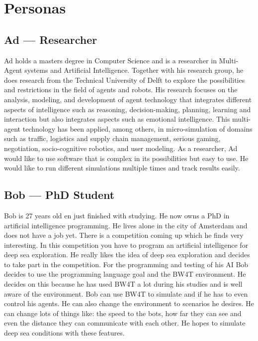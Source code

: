 \section*{Personas}
\subsection*{Ad –-- Researcher}
Ad holds a masters degree in Computer Science and is a researcher in Multi-Agent systems and Artificial Intelligence. Together with his research group, he does research from the Technical University of Delft to explore the possibilities and restrictions in the field of agents and robots. His research focuses on the analysis, modeling, and development of agent technology that integrates different aspects of intelligence such as reasoning, decision-making, planning, learning and interaction but also integrates aspects such as emotional intelligence. This multi-agent technology has been applied, among others, in micro-simulation of domains such as traffic, logistics and supply chain management, serious gaming, negotiation, socio-cognitive robotics, and user modeling. 
As a researcher, Ad would like to use software that is complex in its possibilities but easy to use. He would like to run different simulations multiple times and track results easily.

\subsection*{Bob –-- PhD Student}
Bob is 27 years old en just finished with studying. He now owns a PhD in artificial intelligence programming. He lives alone in the city of Amsterdam and does not have a job yet. There is a competition coming up which he finds very interesting. In this competition you have to program an artificial intelligence for deep sea exploration. He really likes the idea of deep sea exploration and decides to take part in the competition. 
For the programming and testing of his AI Bob decides to use the programming language goal and the BW4T environment. He decides on this because he has used BW4T a lot during his studies and is well aware of the environment. Bob can use BW4T to simulate and if he has to even control his agents. He can also change the environment to scenarios he desires. He can change lots of things like: the speed to the bots, how far they can see and even the distance they can communicate with each other. He hopes to simulate deep sea conditions with these features.

